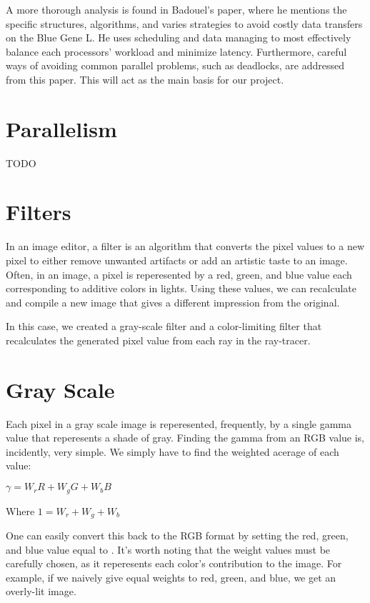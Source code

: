\documentclass{acmsiggraph}
\begin{document}
A more thorough analysis is found in Badouel's paper, where he mentions the
specific structures, algorithms, and varies strategies to avoid costly data
transfers on the Blue Gene L.  He uses scheduling and data managing to most
effectively balance each processors' workload and minimize latency.  Furthermore,
careful ways of avoiding common parallel problems, such as deadlocks, are
addressed from this paper.  This will act as the main basis for our project. 
\cite{badouel1994dda}


\section{Parallelism}
TODO


\section{Filters}
In an image editor, a filter is an algorithm that converts the pixel values to
a new pixel to either remove unwanted artifacts or add an artistic taste to an
image.  Often, in an image, a pixel is reperesented by a red, green, and blue
value each corresponding to additive colors in lights.  Using these values,
we can recalculate and compile a new image that gives a different impression
from the original.

In this case, we created a gray-scale filter and a color-limiting filter
that recalculates the generated pixel value from each ray in the ray-tracer.


\section*{Gray Scale}
Each pixel in a gray scale image is reperesented, frequently, by a single
gamma value that reperesents a shade of gray.  Finding the gamma from an
RGB value is, incidently, very simple.  We simply have to find the weighted
acerage of each value:

$\gamma = W_{r}R + W_{g}G + W_{b}B$

Where $1 = W_{r} + W_{g} + W_{b}$

One can easily convert this back to the RGB format by setting the red,
green, and blue value equal to \gamma.  It's worth noting that the weight
values must be carefully chosen, as it reperesents each color's contribution
to the image.  For example, if we naively give equal weights to red, green,
and blue, we get an overly-lit image.
\end{document}
